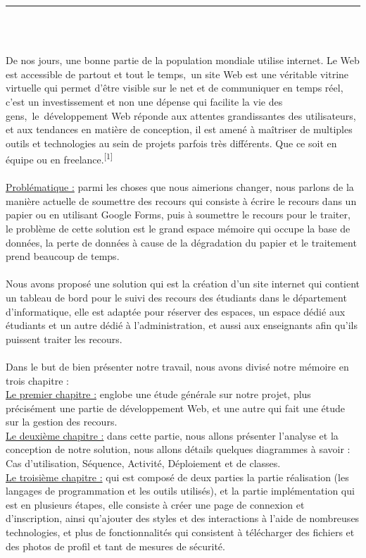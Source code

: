 \documentclass[12pt]{report}
\begin{document}
\begin{center}
    {\color{Blue} \rule{6.2in}{1.4mm} }\\
    \vspace{0.1in}
    \scshape{\fontsize{34}{46}{\bfseries{\color{Blue}{Introduction générale}}}}
    \\
    \vspace{0.5in}
\end{center}
De nos jours, une bonne partie de la population mondiale utilise internet. Le Web est accessible de partout et tout le temps, un site Web est une véritable vitrine virtuelle qui permet d’être visible sur le net et de communiquer en temps réel, c’est un investissement et non une dépense qui facilite la vie des gens, le développement Web réponde aux attentes grandissantes des utilisateurs, et aux tendances en matière de conception, il est amené à maîtriser de multiples outils et technologies au sein de projets parfois très différents. Que ce soit en équipe ou en freelance.\textsuperscript{[1]}
\\\\
\uline{Problématique :} parmi les choses que nous aimerions changer, nous parlons de la manière actuelle de soumettre des recours qui consiste à écrire le recours dans un papier ou en utilisant Google Forms, puis à soumettre le recours pour le traiter, le problème de cette solution est le grand espace mémoire qui occupe la base de données, la perte de données à cause de la dégradation du papier et le traitement prend beaucoup de temps.
\\\\
Nous avons proposé une solution qui est la création d'un site internet qui contient un tableau de bord pour le suivi des recours des étudiants dans le département d'informatique, elle est adaptée pour réserver des espaces, un espace dédié aux étudiants et un autre dédié à l'administration, et aussi aux enseignants afin qu'ils puissent traiter les recours.
\\\\
Dans le but de bien présenter notre travail, nous avons divisé notre mémoire en trois chapitre :
\\
\uline{Le premier chapitre :} englobe une étude générale sur notre projet, plus précisément une partie de développement Web, et une autre qui fait une étude sur la gestion des recours.
\\
\uline{Le deuxième chapitre :} 
dans cette partie, nous allons présenter l'analyse et la conception de notre solution, nous allons détails quelques diagrammes à savoir : Cas d'utilisation, Séquence, Activité,  Déploiement et de classes.
\\
\uline{Le troisième chapitre :} qui est composé de deux parties la partie réalisation (les langages de programmation et les outils utilisés), et la partie implémentation qui est en plusieurs étapes, elle consiste à créer une page de connexion et d'inscription, ainsi qu'ajouter des styles et des interactions à l'aide de nombreuses technologies, et plus de fonctionnalités qui consistent à télécharger des fichiers et des photos de profil et tant de mesures de sécurité.
\end{document}
